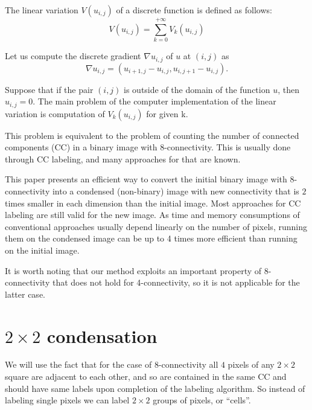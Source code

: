 \documentclass{llncs}
\begin{document}
\begin{definition}
  The linear variation $V(u_{i,j})$ of a discrete function  is defined as follows:
  \begin{equation}
    V(u_{i,j}) = \sum_{k=0}^{+\infty} V_k(u_{i,j})
    \label{eq:V}
  \end{equation}
\end{definition}

Let us compute the discrete gradient $\nabla u_{i,j}$ of $u$ at $(i,j)$ as
\begin{equation}
  \nabla u_{i,j} = (u_{i+1,j} - u_{i,j}, u_{i,j+1} - u_{i,j}).
  \label{eq:gradient}
\end{equation}

Suppose that if the pair $(i,j)$ is outside of the domain of the function $u$, then 
$u_{i,j} = 0$.
The main problem of the computer implementation of the linear variation is 
computation of $V_k(u_{i,j})$ for given k.


This problem is equivalent to the problem of counting the number of connected
components (CC) in a binary image with 8-connectivity.
This is usually done through CC labeling, and many approaches for that are
known\cite{sterzh}.

This paper presents an efficient way to convert the initial binary image
with 8-connectivity into
a condensed (non-binary) image with new connectivity that is $2$ times smaller in
each dimension than the initial image.
Most approaches for CC labeling are still valid for the new image.
As time and memory consumptions of conventional approaches usually depend linearly on
the number of pixels, running them on the condensed image can be up to 4 times
more efficient than running on the initial image.

It is worth noting that our method exploits an important property of 8-connectivity
that does not hold for 4-connectivity, so it is not applicable for the latter case.

\section{$2\times2$ condensation}

We will use the fact that for the case of 8-connectivity all $4$ pixels of any
$2 \times 2$ square are adjacent to each other, and so are contained in the same CC
and should have same labels upon completion of the labeling algorithm.
So instead of labeling single pixels we can label $2 \times 2$ groups of pixels,
or ``cells''.
\end{document}
